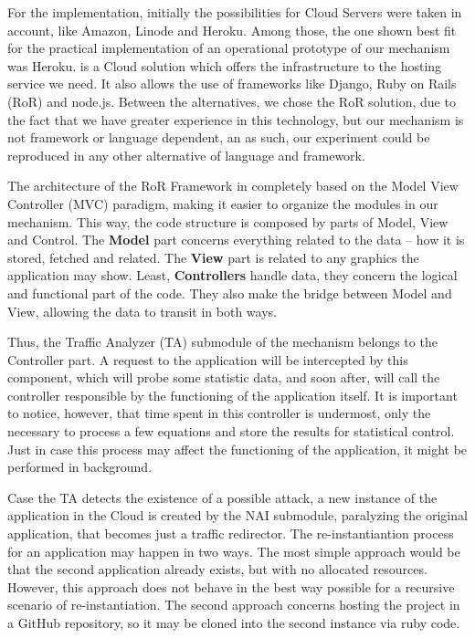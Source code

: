 For the implementation, initially the possibilities for Cloud Servers were taken in account, like Amazon, Linode and Heroku. Among those, the one shown best fit for the practical implementation of an operational prototype of our mechanism was Heroku. \cite{heroku} is a Cloud solution which offers the infrastructure to the hosting service we need. It also allows the use of frameworks like Django, Ruby on Rails (RoR) and node.js. Between the alternatives, we chose the RoR solution, due to the fact that we have greater experience in this technology, but our mechanism is not framework or language dependent, an as such, our experiment could be reproduced in any other alternative of language and framework.

The architecture of the RoR Framework in completely based on the Model View Controller (MVC) paradigm, making it easier to organize the modules in our mechanism. This way, the code structure is composed by parts of Model, View and Control. The \textbf{Model} part concerns everything related to the data -- how it is stored, fetched and related. The \textbf{View} part is related to any graphics the application may show. Least, \textbf{Controllers} handle data, they concern the logical and functional part of the code. They also make the bridge between Model and View, allowing the data to transit in both ways.

Thus, the Traffic Analyzer (TA) submodule of the mechanism belongs to the Controller part. A request to the application will be intercepted by this component, which will probe some statistic data, and soon after, will call the controller responsible by the functioning of the application itself. It is important to notice, however, that time spent in this controller is undermost, only the necessary to process a few equations and store the results for statistical control. Just in case this process may affect the functioning of the application, it might be performed in background.

Case the TA detects the existence of a possible attack, a new instance of the application in the Cloud is created by the NAI submodule, paralyzing the original application, that becomes just a traffic redirector. The re-instantiantion process for an application may happen in two ways. The most simple approach would be that the second application already exists, but with no allocated resources. However, this approach does not behave in the best way possible for a recursive scenario of re-instantiation. The second approach concerns hosting the project in a GitHub repository, so it may be cloned into the second instance via ruby code.


